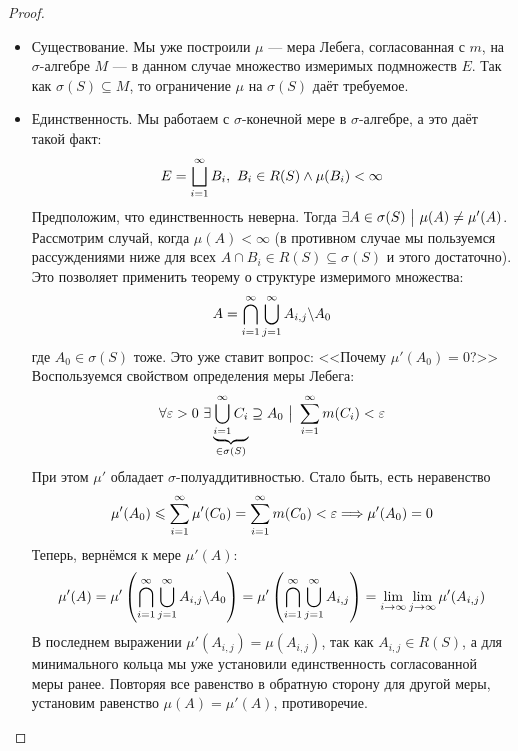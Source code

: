 \begin{proof}~
	\begin{itemize}
		\item Существование. Мы уже построили $\mu$ --- мера Лебега, согласованная с $m$, на $\sigma$-алгебре $M$ --- в данном случае множество измеримых подмножеств $E$. Так как $\sigma(S) \subseteq M$, то ограничение $\mu$ на $\sigma(S)$ даёт требуемое.
		
		\item Единственность. Мы работаем с $\sigma$-конечной мере в $\sigma$-алгебре, а это даёт такой факт:
		\[
			E = \bigsqcup_{i = 1}^\infty B_i,\ B_i \in R(S) \wedge \mu(B_i) < \infty
		\]
		Предположим, что единственность неверна. Тогда $\exists A \in \sigma(S) \ \big|\  \mu(A) \neq \mu'(A)$. Рассмотрим случай, когда $\mu(A) < \infty$ (в противном случае мы пользуемся рассуждениями ниже для всех $A \cap B_i \in R(S) \subseteq \sigma(S)$ и этого достаточно). Это позволяет применить теорему о структуре измеримого множества:
		\[
			A = \bigcap_{i = 1}^\infty \bigcup_{j = 1}^\infty A_{i, j} \backslash A_0
		\]
		где $A_0 \in \sigma(S)$ тоже. Это уже ставит вопрос: <<Почему $\mu'(A_0) = 0$?>> Воспользуемся свойством определения меры Лебега:
		\[
			\forall \varepsilon > 0\ \exists \underbrace{\bigcup_{i = 1}^\infty C_i}_{\in \sigma(S)} \supseteq A_0 \ \big|\  \sum_{i = 1}^\infty m(C_i) < \varepsilon
		\]
		При этом $\mu'$ обладает $\sigma$-полуаддитивностью. Стало быть, есть неравенство
		\[
			\mu'(A_0) \leqslant \sum_{i = 1}^\infty \mu'(C_0) = \sum_{i = 1}^\infty m(C_0) < \varepsilon \Longrightarrow \mu'(A_0) = 0
		\]
		Теперь, вернёмся к мере $\mu'(A)$:
		\[
			\mu'(A) = \mu'\left(\bigcap_{i = 1}^\infty \bigcup_{j = 1}^\infty A_{i, j} \backslash A_0\right) = \mu'\left(\bigcap_{i = 1}^\infty \bigcup_{j = 1}^\infty A_{i, j}\right) = \lim_{i \to \infty} \lim_{j \to \infty} \mu'(A_{i, j})
		\]
		В последнем выражении $\mu'(A_{i, j}) = \mu(A_{i, j})$, так как $A_{i, j} \in R(S)$, а для минимального кольца мы уже установили единственность согласованной меры ранее. Повторяя все равенство в обратную сторону для другой меры, установим равенство $\mu(A) = \mu'(A)$, противоречие.
	\end{itemize}
\end{proof}